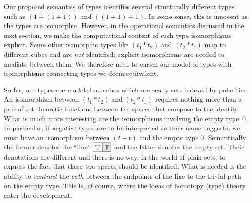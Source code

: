\documentclass[authoryear,preprint]{sigplanconf}
\newcommand{\cubt}{\mathbb{T}}
\newcommand{\nodet}[2]{\fcolorbox{black}{white}{$#1$}\fcolorbox{black}{gray!20}{$#2$}}
\begin{document}
Our proposed semantics of types identifies several structurally different
types such as $(1+(1+1))$ and $((1+1)+1)$. In some sense, this is innocent as
the types are isomorphic. However, in the operational semantics discussed in
the next section, we make the computational content of such type isomorphisms
explicit. Some other isomorphic types like $(t_1*t_2)$ and $(t_2*t_1)$ map to
different cubes and are \emph{not} identified: explicit isomorphisms are
needed to mediate between them. We therefore need to enrich our model of
types with isomorphisms connecting types we deem equivalent.

So far, our types are modeled as cubes which are really sets indexed by
polarities. An isomorphism between $(t_1*t_2)$ and $(t_2*t_1)$ requires
nothing more than a pair of set-theoretic functions between the spaces that
compose to the identity. What is much more interesting are the isomorphisms
involving the empty type~0. In particular, if negative types are to be
interpreted as their name suggests, we must have an isomorphism between
$(t-t)$ and the empty type 0. Semantically the former denotes the ``line''
$\nodet{\cubt}{\cubt}$ and the latter denotes the empty set. Their
denotations are different and there is no way, in the world of plain sets, to
express the fact that these two spaces should be identified. What is needed
is the ability to \emph{contract} the \emph{path} between the endpoints of
the line to the trivial path on the empty type. This is, of course, where the
ideas of homotopy (type) theory enter the development.
\end{document}
